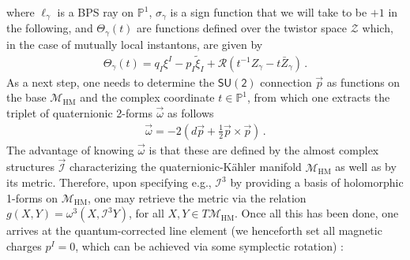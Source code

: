 %
where $\ell_{\gamma}$ is a BPS ray on $\mathbb{P}^1$, $\sigma_{\gamma}$ is a sign function that we will take to be $+1$ in the following, and $\Theta_{\gamma}(t)$ are functions defined over the twistor space $\mathcal{Z}$ which, in the case of mutually local instantons, are given by
%
\begin{align}\label{eq:Thetafn}
	\Theta_{\gamma}(t) = q_I \xi ^I -p_I \tilde{\xi}_I + \mathcal{R} \left( t^{-1} Z_{\gamma}-t \bar{Z}_{\gamma}\right)\, .
\end{align}
%
As a next step, one needs to determine the $\mathsf{SU(2)}$ connection $\vec{p}$ as functions on the base $\mathcal{M}_{\text{HM}}$ and the complex coordinate $t \in \mathbb{P}^1$, from which one extracts the triplet of quaternionic 2-forms $\vec{\omega}$ as follows 
%
\begin{align}
	\vec{\omega}=-2 \left(d \vec{p} + \frac{1}{2} \vec{p} \times \vec{p} \right)\, .
\end{align}
%
The advantage of knowing $\vec{\omega}$ is that these are defined by the almost complex structures $\vec{\mathcal{I}}$ characterizing the quaternionic-K\"ahler manifold $\mathcal{M}_{\text{HM}}$ as well as by its metric. Therefore, upon specifying e.g., $\mathcal{I}^3$ by providing a basis of holomorphic 1-forms on $\mathcal{M}_{\text{HM}}$, one may retrieve the metric via the relation $g(X,Y)=\omega^3 (X, \mathcal{I}^3 Y)$, for all $X,Y \in T\mathcal{M}_{\text{HM}}$. Once all this has been done, one arrives at the quantum-corrected line element (we henceforth set all magnetic charges $p^I=0$, which can be achieved via some symplectic rotation) \cite{Alexandrov:2014sya}:
%

